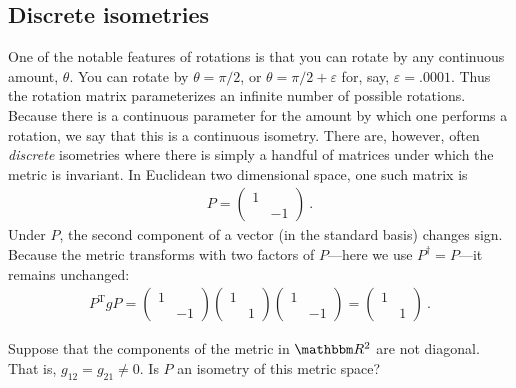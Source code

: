 \documentclass[12pt, oneside]{report}    %
\let\oldsection\section
\def\section{%
  \setcounter{sidenote}{1}%
  \oldsection
}
\begin{document}
\begin{subappendices}
\section{Discrete isometries}
\label{sec:discrete:isometries}

One of the notable features of rotations is that you can rotate by any continuous amount, $\theta$. You can rotate by $\theta=\pi/2$, or $\theta = \pi/2 + \varepsilon$ for, say, $\varepsilon = .0001$. Thus the rotation matrix parameterizes an infinite number of possible rotations. Because there is a continuous parameter for the amount by which one performs a rotation, we say that this is a continuous isometry. There are, however, often \emph{discrete} isometries where there is simply a handful of matrices under which the metric is invariant. In Euclidean two dimensional space, one such matrix is 
\begin{align}
    P = \begin{pmatrix}
        1 & \\
        & -1 
    \end{pmatrix} \ .
\end{align}
Under $P$, the second component of a vector (in the standard basis) changes sign. Because the metric transforms with two factors of $P$---here we use $P^\dag = P$---it remains unchanged:
\begin{align}
    P^\text{T}gP = 
    \begin{pmatrix}
        1 & \\ 
        & -1 
    \end{pmatrix}
    \begin{pmatrix}
        1 & \\ 
        & 1 
    \end{pmatrix}
    \begin{pmatrix}
        1 & \\ 
        & -1 
    \end{pmatrix}
    = 
    \begin{pmatrix}
        1 & \\ 
        & 1 
    \end{pmatrix} \ .
\end{align}
\begin{exercise}
Suppose that the components of the metric in $\RR^2$ are not diagonal. That is, $g_{12} = g_{21}\neq 0$. Is $P$ an isometry of this metric space?
\end{exercise}


\end{subappendices}
\end{document}
